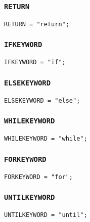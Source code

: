 \documentclass[12pt, a4paper]{article}
\begin{document}
\subsubsection{\texttt{RETURN}}

\begin{verbatim}
RETURN = "return";
\end{verbatim}

\subsubsection{\texttt{IFKEYWORD}}

\begin{verbatim}
IFKEYWORD = "if";
\end{verbatim}

\subsubsection{\texttt{ELSEKEYWORD}}

\begin{verbatim}
ELSEKEYWORD = "else";
\end{verbatim}

\subsubsection{\texttt{WHILEKEYWORD}}

\begin{verbatim}
WHILEKEYWORD = "while";
\end{verbatim}

\subsubsection{\texttt{FORKEYWORD}}

\begin{verbatim}
FORKEYWORD = "for";
\end{verbatim}

\subsubsection{\texttt{UNTILKEYWORD}}

\begin{verbatim}
UNTILKEYWORD = "until";
\end{verbatim}
\end{document}
